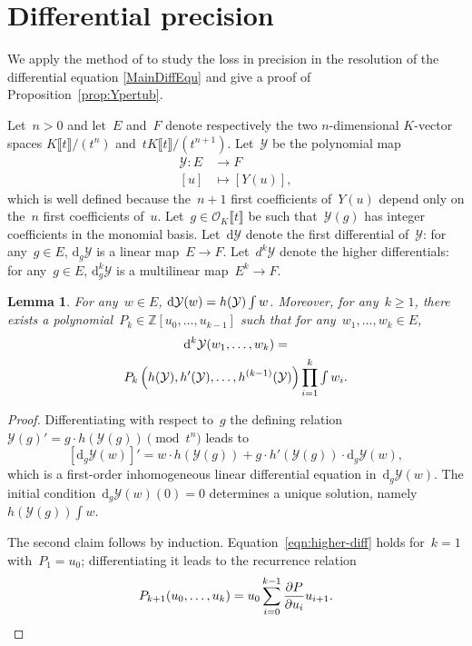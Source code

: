 \documentclass{sig-alternate}
\newtheorem{lem}[theo]{Lemma}
\theoremstyle{definition}
\theoremstyle{remark}
\newcommand{\Z}{\mathbb{Z}}
\newcommand\cO{\mathcal{O}}
\newcommand\cY{\mathcal{Y}}
\newcommand{\ud}{\mathrm{d}}
\newcommand\Opt{\cO_K \llbracket t \rrbracket}
\newcommand\Kpt{K\llbracket t \rrbracket}
\def\geq{\geqslant}
\def\smallint{\begingroup\textstyle \int\endgroup}
\begin{document}
\section{Differential precision}
\label{sec:etude-diff}



We apply the method of \textcite{CarRoeVac14} to study the loss in precision in
the resolution of the differential equation \eqref{MainDiffEqu} and give a
proof of Proposition~\ref{prop:Ypertub}.

Let~$n>0$ and
let~$E$ and~$F$ denote respectively the two $n$-dimensional $K$-vector spaces $\Kpt/(t^{n})$ and~$t\Kpt/(t^{n+1})$.
Let~$\cY$ be the polynomial map
\begin{align*}
  \cY : E &\longrightarrow F \\
        [ u ] &\longmapsto [ Y(u) ],
\end{align*}
which is well defined because the~$n+1$ first coefficients of~$Y(u)$ depend only on the~$n$ first coefficients of~$u$.
Let~$g\in\Opt$ be such that~$\cY(g)$ has integer coefficients in the monomial basis.
Let~$\ud\cY$ denote the first differential of~$\cY$: for any~$g\in E$, $\ud_g \cY$ is a linear map~$E\to F$.
Let~$d^k\cY$ denote the higher differentials: for any~$g\in E$, $\ud^k_g \cY$ is a multilinear map~$E^k\to F$.

\begin{lem}
  \label{lem:diffY}
  For any~$w\in E$, $\ud \cY(w) = h(\cY) \smallint w$. 
  Moreover, for any~$k\geq 1$, there exists a polynomial~$P_k\in \Z[u_0,\dotsc,u_{k-1}]$
  such that for any~$w_1,\dotsc,w_k\in E$,
  \begin{multline}\label{eqn:higher-diff}
  \ud^k \cY(w_1,\dotsc,w_k) = \\ P_k\left( h(\cY), h'(\cY), \dotsc, h^{(k-1)}(\cY) \right) \prod_{i=1}^k \smallint w_i.
  \end{multline}
\end{lem}

\begin{proof}
  Differentiating with respect to~$g$ the defining relation~$\cY(g)' = g \cdot h(\cY(g)) \pmod{t^{n}}$
  leads to
  \[ \left[ \ud_g \cY(w) \right]' = w \cdot h(\cY(g)) + g \cdot h'(\cY(g)) \cdot \ud_g \cY(w), \]
  which is a first-order inhomogeneous linear differential equation in~$\ud_g \cY(w)$.
  The initial condition~$\ud_g \cY(w)(0) = 0$ determines a unique solution, namely $h(\cY(g)) \int w$.


  The second claim follows by induction. Equation~\eqref{eqn:higher-diff} holds for~$k=1$ with~$P_1=u_0$;
  differentiating it leads to the  recurrence relation
  \[ P_{k+1}(u_0,\dotsc,u_k) = u_0 \sum_{i=0}^{k-1} \frac{\partial P}{\partial u_i} u_{i+1}. \qedhere \]
\end{proof}
\end{document}
